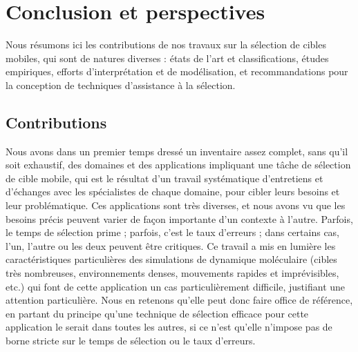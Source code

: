 


\chapter*{Conclusion et perspectives}
\mtcaddchapter %

	Nous résumons ici les contributions de nos travaux sur la sélection de cibles mobiles, qui sont de natures diverses : états de l'art et classifications, études empiriques, efforts d'interprétation et de modélisation, et recommandations pour la conception de techniques d'assistance à la sélection.

	\section*{Contributions}
	Nous avons dans un premier temps dressé un inventaire assez complet, sans qu'il soit exhaustif, des domaines et des applications impliquant une tâche de sélection de cible mobile, qui est le résultat d'un travail systématique d'entretiens et d'échanges avec les spécialistes de chaque domaine, pour cibler leurs besoins et leur problématique. Ces applications sont très diverses, et nous avons vu que les besoins précis peuvent varier de façon importante d'un contexte à l'autre. Parfois, le temps de sélection prime ; parfois, c'est le taux d'erreurs ; dans certains cas, l'un, l'autre ou les deux peuvent être critiques. Ce travail a mis en lumière les caractéristiques particulières des simulations de dynamique moléculaire (cibles très nombreuses, environnements denses, mouvements rapides et imprévisibles, etc.) qui font de cette application un cas particulièrement difficile, justifiant une attention particulière. Nous en retenons qu'elle peut donc faire office de référence, en partant du principe qu'une technique de sélection efficace pour cette application le serait dans toutes les autres, si ce n'est qu'elle n'impose pas de borne stricte sur le temps de sélection ou le taux d'erreurs.
	
